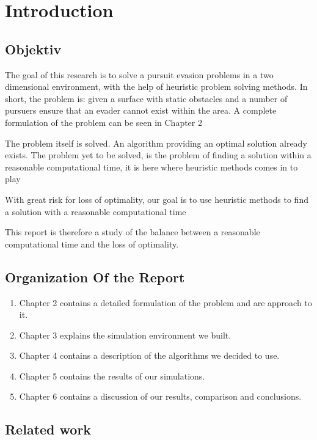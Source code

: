 \chapter{Introduction}
 
\section{Objektiv}
 
The goal of this research is to solve a pursuit evasion problems in a two dimensional environment, with the help of heuristic problem solving methods.
In short, the problem is: given a surface with static obstacles and a number of pursuers ensure that an evader cannot exist within the area. A complete formulation of the problem can be seen in Chapter 2
 
The problem itself is solved. An algorithm providing an optimal solution already exists.
The problem yet to be solved, is the problem of finding a solution within a reasonable computational time, it is here where heuristic methods comes in to play
 
With great risk for loss of optimality, our goal is to use heuristic methods to find a solution with a reasonable computational time
 
This report is therefore a study of the balance between a reasonable computational time and the loss of optimality.
 
\section{Organization Of the Report}
\begin{enumerate}
\item Chapter 2 contains a detailed formulation of the problem and are approach to it.
\item Chapter 3 explains the simulation environment we built.
\item Chapter 4 contains a description of the algorithms we decided to use.
\item Chapter 5 contains the results of our simulations.
\item Chapter 6 contains a discussion of our results, comparison and conclusions.
\end{enumerate}
 
\section{ Related work}
 
